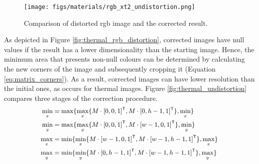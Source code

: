 \begin{figure}[ht]
	\centering
	\texttt{[image: figs/materials/rgb\_xt2\_undistortion.png]}
	\caption{Comparison of distorted \acrshort{rgb} image and the corrected result.}
	\label{fig:rgb_xt2_undistortion}
\end{figure}

As depicted in Figure \ref{fig:thermal_rgb_distortion}, corrected images have null values if the result has a lower dimensionality than the starting image. Hence, the minimum area that presents non-null colours can be determined by calculating the new corners of the image and subsequently cropping it (Equation \ref{eq:matrix_corners}). As a result, corrected images can have lower resolution than the initial ones, as occurs for thermal images. Figure \ref{fig:thermal_undistortion} compares three stages of the correction procedure. 
\begin{gather}
    \small
    \begin{aligned}
    \label{eq:matrix_corners}
    \min_x &= \max \{\max_x \{M \cdot [0, 0, 1]^\mathsf{T}, M \cdot [0, h - 1, 1]^\mathsf{T}\}, \min_x\}\\
    \min_y &= \max \{\max_y\{M \cdot [0, 0, 1]^\mathsf{T}, M \cdot [w - 1, 0, 1]^\mathsf{T}\}, \min_y\}\\
    \max_x &= \min \{\min_x\{M \cdot [w - 1, 0, 1]^\mathsf{T}, M \cdot [w - 1, h - 1, 1]^\mathsf{T}\}, \max_x\}\\
    \max_y &= \min \{\min_y\{M \cdot [0, h - 1, 1]^\mathsf{T}, M \cdot [w - 1, h - 1, 1]^\mathsf{T}\}, \max_y\}\\
    \end{aligned}
    \normalsize
\end{gather}

